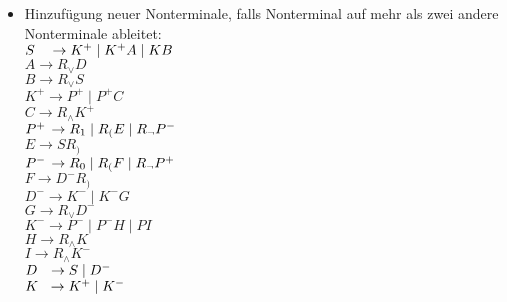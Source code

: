 \documentclass[11pt]{article}
\begin{document}
\begin{enumerate}
\begin{itemize}
\item \hspace*{6mm} Hinzufügung neuer Nonterminale, falls Nonterminal auf mehr \hspace*{6mm} als zwei andere Nonterminale ableitet:
\\\hspace*{6mm} $S \hspace{3,5mm}\rightarrow K^{+}\mid K^{+} A\mid KB$
\\\hspace*{6mm} $A \rightarrow R_{\vee}D$
\\\hspace*{6mm} $B \rightarrow R_{\vee}S$
\\\hspace*{6mm} $K^{+} \rightarrow P^{+}\mid P^{+}C$
\\\hspace*{6mm} $C \rightarrow R_{\wedge}K^{+}$
\\\hspace*{6mm} $P^{+} \hspace{0,5mm}\rightarrow R_{1}\mid R_{(}E\mid R_{\neg} P^{-}$
\\\hspace*{6mm} $E \rightarrow SR_{)}$
\\\hspace*{6mm} $P^{-} \hspace{0,5mm}\rightarrow R_{0}\mid R_{(}F\mid R_{\neg}P^{+}$
\\\hspace*{6mm} $F \rightarrow D^{-}R_{)}$
\\\hspace*{6mm} $D^{-} \rightarrow K^{-}\mid K^{-}G$
\\\hspace*{6mm} $G \rightarrow R_{\vee}D^{-}$
\\\hspace*{6mm} $K^{-} \rightarrow P^{-}\mid P^{-} H\mid P I$
\\\hspace*{6mm} $H \rightarrow R_{\wedge} K$
\\\hspace*{6mm} $I \rightarrow R_{\wedge} K^{-}$
\\\hspace*{6mm} $D \hspace{2,5mm}\rightarrow S\mid D^{-}$
\\\hspace*{6mm} $K \hspace{2,2mm}\rightarrow K^{+}\mid K^{-}$

\end{itemize}
\end{enumerate}
\end{document}
